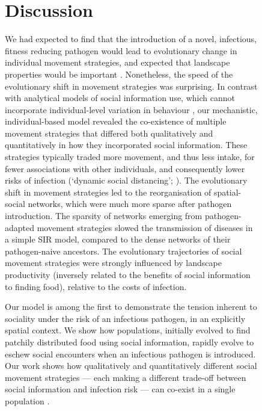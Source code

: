 \begin{figure}[!h]
\section*{Discussion}

We had expected to find that the introduction of a novel, infectious, fitness reducing pathogen would lead to evolutionary change in individual movement strategies, and expected that landscape properties would be important \citep{white2018}.
Nonetheless, the speed of the evolutionary shift in movement strategies was surprising.
In contrast with analytical models of social information use, which cannot incorporate individual-level variation in behaviour \citep{romano2020, ashby2021, romano2021}, our mechanistic, individual-based model revealed the co-existence of multiple movement strategies that differed both qualitatively and quantitatively in how they incorporated social information.
These strategies typically traded more movement, and thus less intake, for fewer associations with other individuals, and consequently lower risks of infection (`dynamic social distancing'; \citealt{pusceddu2021}).
The evolutionary shift in movement strategies led to the reorganisation of spatial-social networks, which were much more sparse after pathogen introduction.
The sparsity of networks emerging from pathogen-adapted movement strategies slowed the transmission of diseases in a simple SIR model, compared to the dense networks of their pathogen-naive ancestors.
The evolutionary trajectories of social movement strategies were strongly influenced by landscape productivity (inversely related to the benefits of social information to finding food), relative to the costs of infection.

Our model is among the first to demonstrate the tension inherent to sociality under the risk of an infectious pathogen, in an explicitly spatial context.
We show how populations, initially evolved to find patchily distributed food using social information, rapidly evolve to eschew social encounters when an infectious pathogen is introduced.
Our work shows how qualitatively and quantitatively different social movement strategies --- each making a different trade-off between social information and infection risk --- can co-exist in a single population \citep{gartland2021}.



\end{figure}
